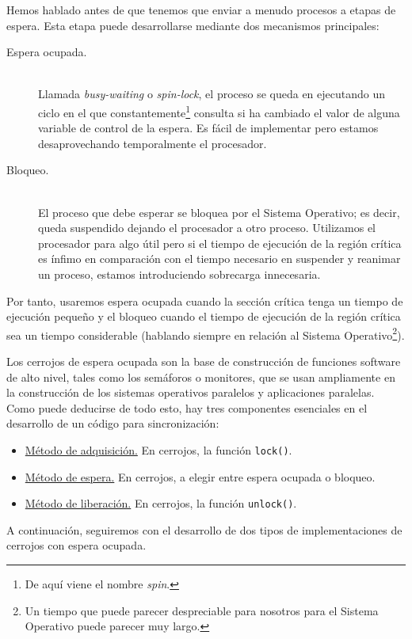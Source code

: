 Hemos hablado antes de que tenemos que enviar a menudo procesos a etapas de espera. Esta etapa puede desarrollarse mediante dos mecanismos principales:
\begin{description}
    \item [Espera ocupada.]~\\
        Llamada \emph{busy-waiting} o \emph{spin-lock}, el proceso se queda en  ejecutando un ciclo en el que constantemente\footnote{De aquí viene el nombre \emph{spin}.} consulta si ha cambiado el valor de alguna variable de control de la espera.
        Es fácil de implementar pero estamos desaprovechando temporalmente el procesador.
    \item [Bloqueo.]~\\
        El proceso que debe esperar se bloquea por el Sistema Operativo; es decir, queda suspendido dejando el procesador a otro proceso.
        Utilizamos el procesador para algo útil pero si el tiempo de ejecución de la región crítica es ínfimo en comparación con el tiempo necesario en suspender y reanimar un proceso, estamos introduciendo sobrecarga innecesaria.
\end{description}
Por tanto, usaremos espera ocupada cuando la sección crítica tenga un tiempo de ejecución pequeño y el bloqueo cuando el tiempo de ejecución de la región crítica sea un tiempo considerable (hablando siempre en relación al Sistema Operativo\footnote{Un tiempo que puede parecer despreciable para nosotros para el Sistema Operativo puede parecer muy largo.}).

Los cerrojos de espera ocupada son la base de construcción de funciones software de alto nivel, tales como los semáforos o monitores, que se usan ampliamente en la construcción de los sistemas operativos paralelos y aplicaciones paralelas.\\

Como puede deducirse de todo esto, hay tres componentes esenciales en el desarrollo de un código para sincronización:
\begin{itemize}
    \item\ul{Método de adquisición.} En cerrojos, la función \verb|lock()|.
    \item\ul{Método de espera.} En cerrojos, a elegir entre espera ocupada o bloqueo.
    \item\ul{Método de liberación.} En cerrojos, la función \verb|unlock()|.
\end{itemize}
A continuación, seguiremos con el desarrollo de dos tipos de implementaciones de cerrojos con espera ocupada.

